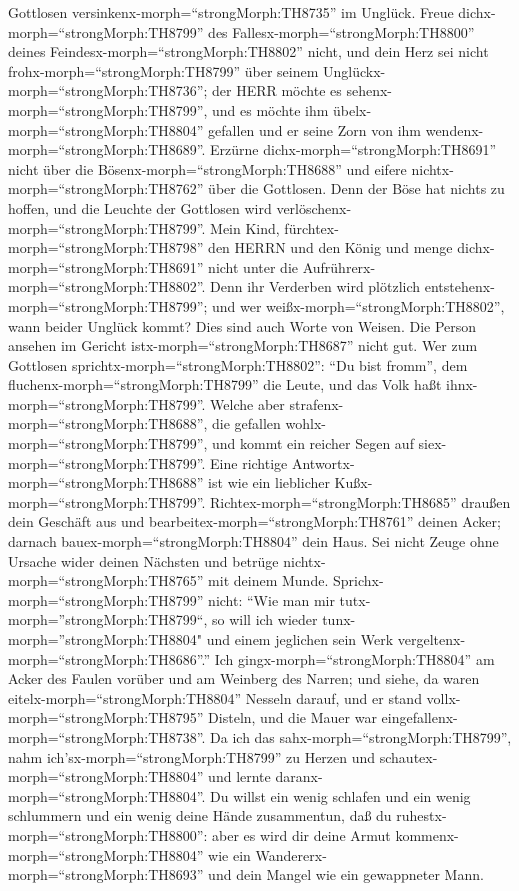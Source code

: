 Gottlosen versinkenx-morph=``strongMorph:TH8735'' im Unglück.
 Freue dichx-morph=``strongMorph:TH8799'' des
Fallesx-morph=``strongMorph:TH8800'' deines
Feindesx-morph=``strongMorph:TH8802'' nicht, und dein Herz sei nicht
frohx-morph=``strongMorph:TH8799'' über seinem
Unglückx-morph=``strongMorph:TH8736'';  der HERR möchte es
sehenx-morph=``strongMorph:TH8799'', und es möchte ihm
übelx-morph=``strongMorph:TH8804'' gefallen und er seine Zorn von ihm
wendenx-morph=``strongMorph:TH8689''.  Erzürne
dichx-morph=``strongMorph:TH8691'' nicht über die
Bösenx-morph=``strongMorph:TH8688'' und eifere
nichtx-morph=``strongMorph:TH8762'' über die Gottlosen. 
Denn der Böse hat nichts zu hoffen, und die Leuchte der Gottlosen wird
verlöschenx-morph=``strongMorph:TH8799''.  Mein Kind,
fürchtex-morph=``strongMorph:TH8798'' den HERRN und den König und menge
dichx-morph=``strongMorph:TH8691'' nicht unter die
Aufrührerx-morph=``strongMorph:TH8802''.  Denn ihr
Verderben wird plötzlich entstehenx-morph=``strongMorph:TH8799''; und
wer weißx-morph=``strongMorph:TH8802'', wann beider Unglück kommt?
 Dies sind auch Worte von Weisen. Die Person ansehen im
Gericht istx-morph=``strongMorph:TH8687'' nicht gut.  Wer
zum Gottlosen sprichtx-morph=``strongMorph:TH8802'': ``Du bist fromm'',
dem fluchenx-morph=``strongMorph:TH8799'' die Leute, und das Volk haßt
ihnx-morph=``strongMorph:TH8799''.  Welche aber
strafenx-morph=``strongMorph:TH8688'', die gefallen
wohlx-morph=``strongMorph:TH8799'', und kommt ein reicher Segen auf
siex-morph=``strongMorph:TH8799''.  Eine richtige
Antwortx-morph=``strongMorph:TH8688'' ist wie ein lieblicher
Kußx-morph=``strongMorph:TH8799''. 
Richtex-morph=``strongMorph:TH8685'' draußen dein Geschäft aus und
bearbeitex-morph=``strongMorph:TH8761'' deinen Acker; darnach
bauex-morph=``strongMorph:TH8804'' dein Haus.  Sei nicht
Zeuge ohne Ursache wider deinen Nächsten und betrüge
nichtx-morph=``strongMorph:TH8765'' mit deinem Munde. 
Sprichx-morph=``strongMorph:TH8799'' nicht: ``Wie man mir
tutx-morph=''strongMorph:TH8799``, so will ich wieder
tunx-morph=''strongMorph:TH8804" und einem jeglichen sein Werk
vergeltenx-morph=``strongMorph:TH8686''.''  Ich
gingx-morph=``strongMorph:TH8804'' am Acker des Faulen vorüber und am
Weinberg des Narren;  und siehe, da waren
eitelx-morph=``strongMorph:TH8804'' Nesseln darauf, und er stand
vollx-morph=``strongMorph:TH8795'' Disteln, und die Mauer war
eingefallenx-morph=``strongMorph:TH8738''.  Da ich das
sahx-morph=``strongMorph:TH8799'', nahm
ich'sx-morph=``strongMorph:TH8799'' zu Herzen und
schautex-morph=``strongMorph:TH8804'' und lernte
daranx-morph=``strongMorph:TH8804''.  Du willst ein wenig
schlafen und ein wenig schlummern und ein wenig deine Hände zusammentun,
daß du ruhestx-morph=``strongMorph:TH8800'':  aber es wird
dir deine Armut kommenx-morph=``strongMorph:TH8804'' wie ein
Wandererx-morph=``strongMorph:TH8693'' und dein Mangel wie ein
gewappneter Mann.

